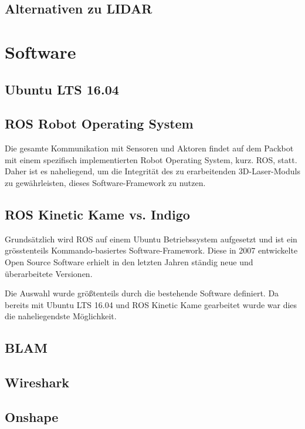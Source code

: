 \subsection{Alternativen zu LIDAR}
 \label{subsec:Alternative}
 

\section{Software}
\label{sec:Software}

\subsection{Ubuntu LTS 16.04}

\subsection{ROS Robot Operating System}
\label{subsec:ROS}
Die gesamte Kommunikation mit Sensoren und Aktoren findet auf dem Packbot mit einem spezifisch implementierten Robot Operating System, kurz. ROS, statt. Daher ist es naheliegend, um die Integrität des zu erarbeitenden 3D-Laser-Moduls zu gewährleisten, dieses Software-Framework zu nutzen.  

\subsection{ROS Kinetic Kame vs. Indigo}
\label{subsec:OS_versus} 
Grundsätzlich wird ROS auf einem Ubuntu Betriebssystem aufgesetzt und ist ein grösstenteils Kommando-basiertes Software-Framework. Diese in 2007 entwickelte Open Source Software erhielt in den letzten Jahren ständig neue und überarbeitete Versionen. 

Die Auswahl wurde größtenteils durch die bestehende Software definiert. Da bereits mit Ubuntu LTS 16.04 und ROS Kinetic Kame gearbeitet wurde war dies die naheliegendste Möglichkeit.

\subsection{BLAM}
\blinditemize

\subsection{Wireshark}
\label{Mind Map}

\subsection{Onshape}
\label{OnShape}

